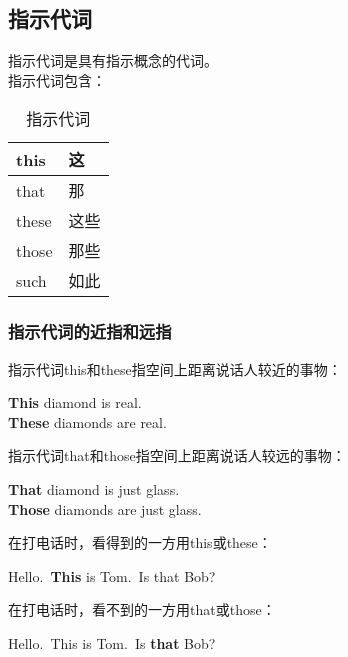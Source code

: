 \documentclass[UTF8]{ctexart}
\begin{document}
\newpage

\subsection{指示代词}
    指示代词是具有指示概念的代词。\\[3mm]
    指示代词包含：
    \begin{table}[h]
        \begin{center}
            \ttfamily
            \begin{tabular}{p{70pt}|p{70pt}}
                \hline
                this&这\\ \hline
                that&那\\ \hline
                these&这些\\ \hline
                those&那些\\ \hline
                such&如此\\ \hline
            \end{tabular}
            \rmfamily
            \caption{指示代词}
        \end{center}
    \end{table}\vspace{-30pt}

\subsubsection{指示代词的近指和远指}
    指示代词{\hspace{3pt}\ttfamily this}和{\hspace{3pt}\ttfamily these}指空间上距离说话人较近的事物：
    \begin{center}
        \large\ttfamily
        \textbf{This} diamond is real.\\[2mm]
        \textbf{These} diamonds are real.\\[4mm]
    \end{center}
    指示代词{\hspace{3pt}\ttfamily that}和{\hspace{3pt}\ttfamily those}指空间上距离说话人较远的事物：
    \begin{center}
        \large\ttfamily
        \textbf{That} diamond is just glass.\\[2mm]
        \textbf{Those} diamonds are just glass.\\[4mm]
    \end{center}
    在打电话时，看得到的一方用{\hspace{3pt}\ttfamily this}或{\hspace{3pt}\ttfamily these}：
    \begin{center}
        \large\ttfamily
        Hello.~\textbf{This} is Tom.~Is that Bob?\\[4mm]
    \end{center}
    在打电话时，看不到的一方用{\hspace{3pt}\ttfamily that}或{\hspace{3pt}\ttfamily those}：
    \begin{center}
        \large\ttfamily
        Hello.~This is Tom.~Is \textbf{that} Bob?
    \end{center}
\end{document}
